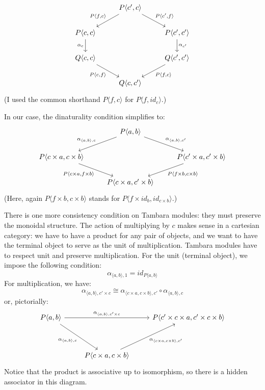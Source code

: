 \documentclass[DaoFP]{subfiles}
\begin{document}
\[
 \begin{tikzcd}
 & P \langle c', c \rangle
 \arrow[dl, "{P \langle f, c \rangle}"']
 \arrow[dr, "{P \langle c', f \rangle}"]
 \\
 P \langle c, c \rangle 
  \arrow[d, "\alpha_c"']
 && P \langle c', c' \rangle
 \arrow[d, "\alpha_{c'}"]
 \\
 Q \langle c, c \rangle
   \arrow[dr, "{P \langle c, f \rangle}"']
 &&  Q \langle c', c' \rangle
 \arrow[dl,"{P \langle f, c \rangle}"]
\\
&Q \langle c, c' \rangle
 \end{tikzcd}
\]
(I used the common shorthand $P \langle f, c \rangle$ for $P \langle f, id_c \rangle$.)

In our case, the dinaturality condition simplifies to:
\[
 \begin{tikzcd}
 & P \langle a, b \rangle
 \arrow[dl, "{\alpha_{\langle a, b \rangle, c}}"']
 \arrow[dr, "{\alpha_{\langle a, b \rangle, c'}}"]
 \\
 P \langle c \times a, c \times b \rangle
   \arrow[dr, "{P \langle c \times a, f \times b \rangle}"']
 &&  P \langle c' \times a, c'  \times b\rangle
 \arrow[dl,"{P \langle f \times b, c \times b \rangle}"]
\\
&P \langle c \times a, c' \times b \rangle
 \end{tikzcd}
\]
(Here, again $P \langle f \times b, c \times b \rangle$ stands for $P \langle f \times id_b, id_{c \times b} \rangle$.)

There is one more consistency condition on Tambara modules: they must preserve the monoidal structure. The action of multiplying by $c$ makes sense in a cartesian category: we have to have a product for any pair of objects, and we want to have the terminal object to serve as the unit of multiplication. Tambara modules have to respect unit and preserve multiplication. For the unit (terminal object), we impose the following condition:
\[ \alpha_{\langle a, b \rangle, 1} = id _{P \langle a, b \rangle}\]
For multiplication, we have:
\[ \alpha_{\langle a, b \rangle, c' \times c} \cong  \alpha_{\langle c \times a, c \times b \rangle, c'} \circ  \alpha_{\langle a, b \rangle, c}\]
or, pictorially:
\[
 \begin{tikzcd}
 P \langle a, b \rangle
 \arrow[rr, "{\alpha_{\langle a, b \rangle, c' \times c } }"]
 \arrow[rdd, "{ \alpha_{\langle a, b \rangle, c}}"']
 &&
 P \langle c' \times c \times a, c' \times c \times b \rangle
 \\
 \\
 & P \langle c \times a, c \times b \rangle
  \arrow[ruu, "{\alpha_{\langle c \times a, c \times b \rangle, c'}}"']
\end{tikzcd}
\]
Notice that the product is associative up to isomorphism, so there is a hidden associator in this diagram.
\end{document}
